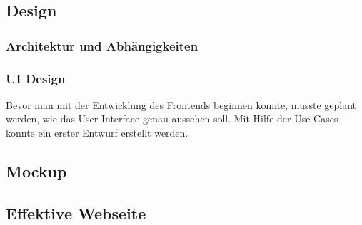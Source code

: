 \subsection{Design}
\subsubsection{Architektur und Abhängigkeiten}

\subsubsection{UI Design}
Bevor man mit der Entwicklung des Frontends beginnen konnte, musste geplant werden, wie das User Interface genau aussehen soll. Mit Hilfe der Use Cases konnte ein erster Entwurf erstellt werden. 

\subsection{Mockup}

\newpage



\subsection{Effektive Webseite}

\newpage